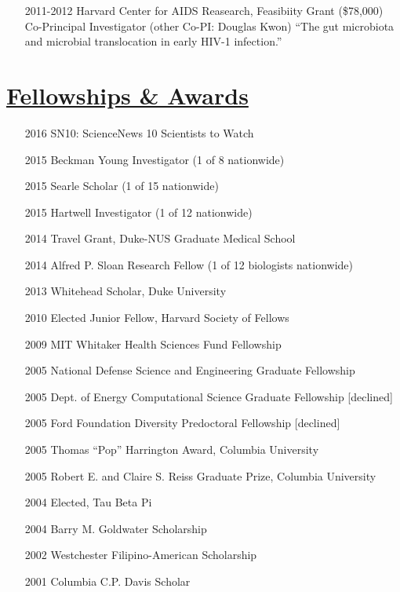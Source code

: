 \documentclass[overlapped,line,11pt]{res}
\begin{document}
\begin{resume}
\begin{itemize}[leftmargin=2cm, style=sameline]
\item[2011-2012] Harvard Center for AIDS Reasearch, Feasibiity Grant (\$78,000) \newline
  Co-Principal Investigator (other Co-PI: Douglas Kwon) \newline ``The gut microbiota and microbial
translocation in early HIV-1 infection.''

\end{itemize}

\section{\underline{\sc Fellowships \& Awards}} 
\vspace{.25in}

\begin{itemize}[leftmargin=1cm, style=sameline, itemsep=0mm]
\item[2016] SN10: ScienceNews 10 Scientists to Watch
\item[2015] Beckman Young Investigator (1 of 8 nationwide)
\item[2015] Searle Scholar (1 of 15 nationwide)
\item[2015] Hartwell Investigator (1 of 12 nationwide)
\item[2014] Travel Grant, Duke-NUS Graduate Medical School
\item[2014] Alfred P. Sloan Research Fellow (1 of 12 biologists nationwide)
\item[2013] Whitehead Scholar, Duke University%
\item[2010] Elected Junior Fellow, Harvard Society of Fellows%
\item[2009] MIT Whitaker Health Sciences Fund Fellowship %
\item[2005] National Defense Science and Engineering Graduate
  Fellowship
\item[2005] Dept. of Energy Computational Science Graduate Fellowship [declined]
\item[2005] Ford Foundation Diversity Predoctoral Fellowship [declined]
\item[2005] Thomas ``Pop'' Harrington Award, Columbia University
\item[2005] Robert E. and Claire S. Reiss Graduate Prize, Columbia University
\item[2004] Elected, Tau Beta Pi
\item[2004] Barry M. Goldwater Scholarship
\item[2002] Westchester Filipino-American Scholarship
\item[2001] Columbia C.P. Davis Scholar


\end{itemize}
\end{resume}
\end{document}
